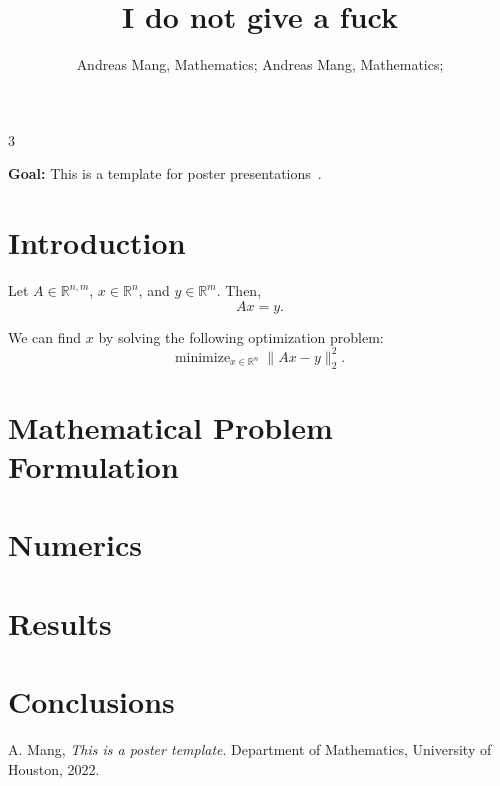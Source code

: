 \documentclass[plainsections,30pt]{sciposter}
\author{Andreas Mang, Mathematics; Andreas Mang, Mathematics;}
\title{I do not give a fuck}
\def\numcols{3}
\begin{document}


\begin{multicols}{\numcols}

\begin{sectionbox}{}
\textbf{Goal:} This is a template for poster presentations~\cite{Mang:2022a}.
\end{sectionbox}


\section*{Introduction}

Let $A \in \mathbb{R}^{n,m}$, $x \in \mathbb{R}^n$, and $y \in \mathbb{R}^m$. Then,
\[
A x = y.
\]

We can find $x$ by solving the following optimization problem:
\[
\text{minimize}_{x\in\mathbb{R}^n} \; \|Ax-y\|_2^2.
\]

\section*{Mathematical Problem Formulation}


\section*{Numerics}


\section*{Results}


\section*{Conclusions}


\begin{footnotesize}
\begin{thebibliography}{9}
 A. Mang, {\em This is a poster template}. Department of Mathematics, University of Houston, 2022.
\end{thebibliography}
\end{footnotesize}

\end{multicols}
\end{document}
